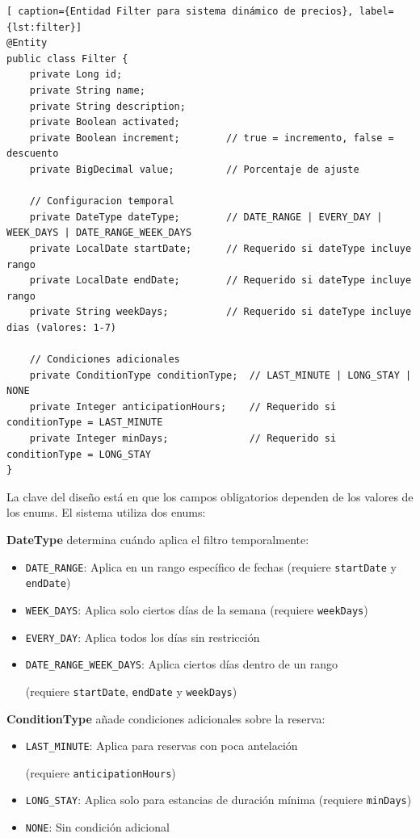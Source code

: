 \begin{lstlisting}[ caption={Entidad Filter para sistema dinámico de precios}, label={lst:filter}]
@Entity
public class Filter {
    private Long id;
    private String name;
    private String description;
    private Boolean activated;
    private Boolean increment;        // true = incremento, false = descuento
    private BigDecimal value;         // Porcentaje de ajuste
    
    // Configuracion temporal
    private DateType dateType;        // DATE_RANGE | EVERY_DAY | WEEK_DAYS | DATE_RANGE_WEEK_DAYS
    private LocalDate startDate;      // Requerido si dateType incluye rango
    private LocalDate endDate;        // Requerido si dateType incluye rango
    private String weekDays;          // Requerido si dateType incluye dias (valores: 1-7)
    
    // Condiciones adicionales
    private ConditionType conditionType;  // LAST_MINUTE | LONG_STAY | NONE
    private Integer anticipationHours;    // Requerido si conditionType = LAST_MINUTE
    private Integer minDays;              // Requerido si conditionType = LONG_STAY
}
\end{lstlisting}












La clave del diseño está en que los campos obligatorios dependen de los valores de los enums. El sistema utiliza dos enums:

\textbf{DateType} determina cuándo aplica el filtro temporalmente:
\begin{itemize}
\item \texttt{DATE\_RANGE}: Aplica en un rango específico de fechas (requiere \texttt{startDate} y \texttt{endDate})
\item \texttt{WEEK\_DAYS}: Aplica solo ciertos días de la semana (requiere \texttt{weekDays})
\item \texttt{EVERY\_DAY}: Aplica todos los días sin restricción
\item \texttt{DATE\_RANGE\_WEEK\_DAYS}: Aplica ciertos días dentro de un rango

(requiere \texttt{startDate}, \texttt{endDate} y \texttt{weekDays})
\end{itemize}

\textbf{ConditionType} añade condiciones adicionales sobre la reserva:
\begin{itemize}
\item \texttt{LAST\_MINUTE}: Aplica para reservas con poca antelación

(requiere \texttt{anticipationHours})
\item \texttt{LONG\_STAY}: Aplica solo para estancias de duración mínima (requiere \texttt{minDays})
\item \texttt{NONE}: Sin condición adicional
\end{itemize}

